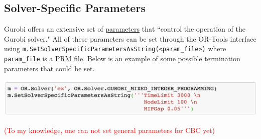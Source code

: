\documentclass[11 pt]{article}
\newcommand{\code}[1]{\colorbox{gray!10}{\textcolor{black!85}{\texttt{#1}}}}
\begin{document}
\subsection{Solver-Specific Parameters}

Gurobi offers an extensive set of \href{https://www.gurobi.com/documentation/9.0/refman/parameters.html}{parameters} that ``control the operation of the Gurobi solver." All of these parameters can be set through the OR-Tools interface using \code{m.SetSolverSpecificParametersAsString(<param\_file>)} where \texttt{param\_file} is a \href{https://www.gurobi.com/documentation/9.0/refman/prm_format.html#format:PRM}{PRM file}. Below is an example of some possible termination parameters that could be set.

\begin{center}
\includegraphics[scale=0.7]{Gparams.png}
\end{center}

\textcolor{red}{(To my knowledge, one can not set general parameters for CBC yet)}
\end{document}
